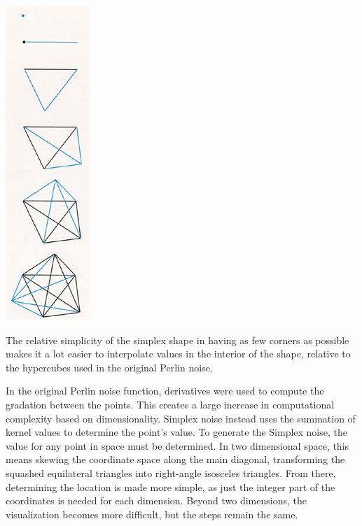 \documentclass[10pt]{report}
\begin{document}
			\begin{minipage}{\textwidth}
				\centering
				\includegraphics[scale=.75]{six simplexes}
				\label{fig:fig2}
			\end{minipage}
			
			The relative simplicity of the simplex shape in having as few corners as possible makes it a lot easier to interpolate values in the interior of the shape, relative to the hypercubes used in the original Perlin noise.
			
			In the original Perlin noise function, derivatives were used to compute the gradation between the points. This creates a large increase in computational complexity based on dimensionality. Simplex noise instead uses the summation of kernel values to determine the point's value. To generate the Simplex noise, the value for any point in space must be determined. In two dimensional space, this means skewing the coordinate space along the main diagonal, transforming the squashed equilateral triangles into right-angle isosceles triangles. From there, determining the location is made more simple, as just the integer part of the coordinates is needed for each dimension. Beyond two dimensions, the visualization becomes more difficult, but the steps remain the same.  
			
\end{document}
